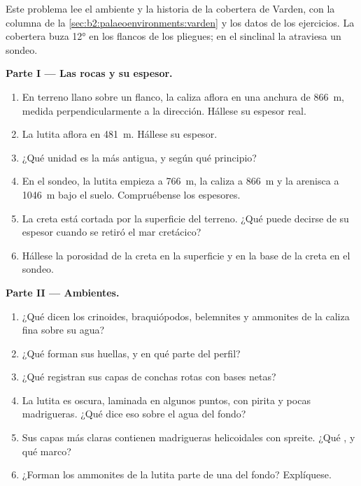 \begin{problem}\label{pb:b2:palaeoenvironments:1}
Este problema lee el ambiente y la historia de la cobertera de Varden, con la columna de la
\cref{sec:b2:palaeoenvironments:varden} y los datos de los ejercicios. La cobertera buza
\ang{12} en los flancos de los pliegues; en el sinclinal la atraviesa un sondeo.

\medskip\noindent\textbf{Parte I --- Las rocas y su espesor.}
\begin{enumerate}
  \item En terreno llano sobre un flanco, la caliza aflora en una anchura de \qty{866}{m}, medida
        perpendicularmente a la dirección. Hállese su espesor real.
  \item La lutita aflora en \qty{481}{m}. Hállese su espesor.
  \item ¿Qué unidad es la más antigua, y según qué principio?
  \item En el sondeo, la lutita empieza a \qty{766}{m}, la caliza a \qty{866}{m} y la
        arenisca a \qty{1046}{m} bajo el suelo. Compruébense los espesores.
  \item La creta está cortada por la superficie del terreno. ¿Qué puede decirse de su espesor cuando
        se retiró el mar cretácico?
  \item Hállese la porosidad de la creta en la superficie y en la base de la creta en el sondeo.
\end{enumerate}

\medskip\noindent\textbf{Parte II --- Ambientes.}
\begin{enumerate}[resume]
  \item ¿Qué dicen los crinoides, braquiópodos, belemnites y ammonites de la caliza fina
        sobre su agua?
  \item ¿Qué  forman sus huellas, y en qué parte del perfil?
  \item ¿Qué registran sus capas de conchas rotas con bases netas?
  \item La lutita es oscura, laminada en algunos puntos, con pirita y pocas madrigueras. ¿Qué dice eso
        sobre el agua del fondo?
  \item Sus capas más claras contienen madrigueras helicoidales con spreite. ¿Qué , y qué marco?
  \item ¿Forman los ammonites de la lutita parte de una  del fondo? Explíquese.
\end{enumerate}


\end{problem}
